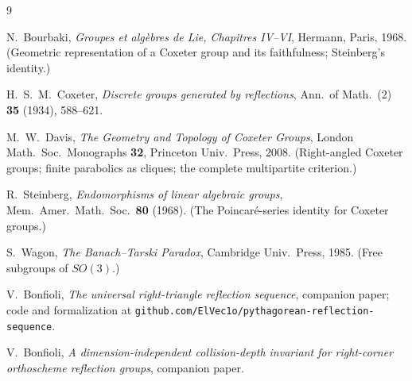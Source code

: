 \documentclass[11pt]{article}
\theoremstyle{definition}
\begin{document}
\begin{thebibliography}{9}

 N.~Bourbaki, \emph{Groupes et alg\`ebres de Lie, Chapitres IV--VI},
Hermann, Paris, 1968. (Geometric representation of a Coxeter group and its faithfulness;
Steinberg's identity.)

 H.~S.~M.~Coxeter, \emph{Discrete groups generated by reflections},
Ann.\ of Math.\ (2) \textbf{35} (1934), 588--621.

 M.~W.~Davis, \emph{The Geometry and Topology of Coxeter Groups},
London Math.\ Soc.\ Monographs \textbf{32}, Princeton Univ.\ Press, 2008.
(Right-angled Coxeter groups; finite parabolics as cliques; the complete multipartite criterion.)

 R.~Steinberg, \emph{Endomorphisms of linear algebraic groups},
Mem.\ Amer.\ Math.\ Soc.\ \textbf{80} (1968).
(The Poincar\'e-series identity for Coxeter groups.)

 S.~Wagon, \emph{The Banach--Tarski Paradox},
Cambridge Univ.\ Press, 1985. (Free subgroups of $SO(3)$.)

 V.~Bonfioli, \emph{The universal right-triangle reflection sequence},
companion paper; code and formalization at
\texttt{github.com/ElVec1o/pythagorean-reflection-sequence}.

 V.~Bonfioli, \emph{A dimension-independent collision-depth invariant for
right-corner orthoscheme reflection groups}, companion paper.

\end{thebibliography}
\end{document}
